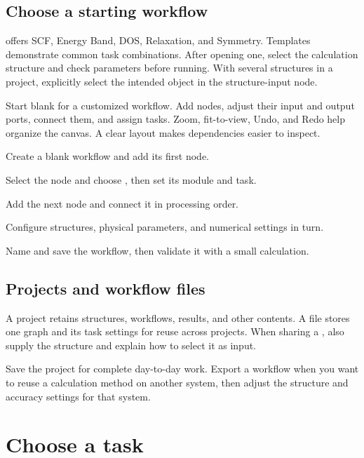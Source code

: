 \subsection{Choose a starting workflow}

 offers SCF, Energy Band, DOS, Relaxation, and Symmetry. Templates demonstrate common task combinations. After opening one, select the calculation structure and check parameters before running. With several structures in a project, explicitly select the intended object in the structure-input node.

Start blank for a customized workflow. Add nodes, adjust their input and output ports, connect them, and assign tasks. Zoom, fit-to-view, Undo, and Redo help organize the canvas. A clear layout makes dependencies easier to inspect.

\begin{steps}
\item Create a blank workflow and add its first node.
\item Select the node and choose , then set its module and task.
\item Add the next node and connect it in processing order.
\item Configure structures, physical parameters, and numerical settings in turn.
\item Name and save the workflow, then validate it with a small calculation.
\end{steps}

\subsection{Projects and workflow files}

A  project retains structures, workflows, results, and other contents. A  file stores one graph and its task settings for reuse across projects. When sharing a , also supply the structure and explain how to select it as input.

Save the project for complete day-to-day work. Export a workflow when you want to reuse a calculation method on another system, then adjust the structure and accuracy settings for that system.

\section{Choose a task}\label{sec:task-catalog}

